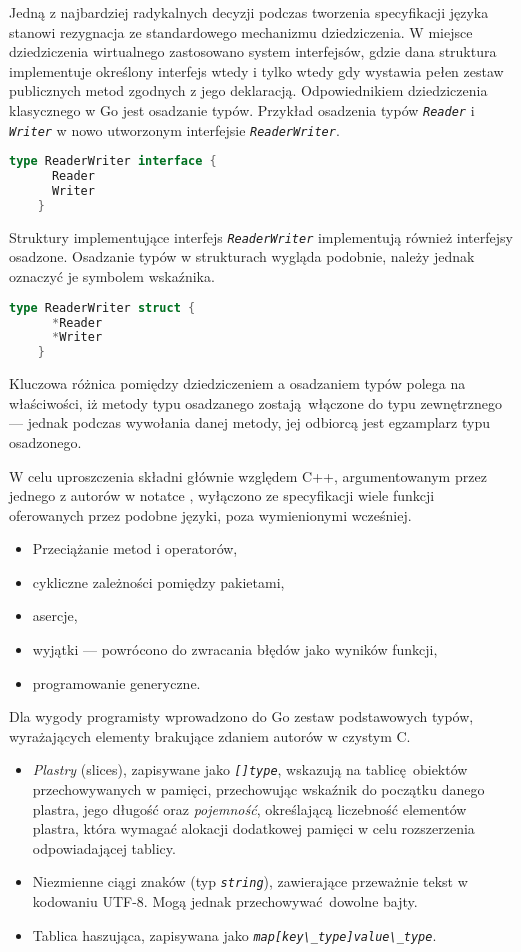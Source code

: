   \par{
  Jedną z najbardziej radykalnych decyzji podczas tworzenia specyfikacji języka stanowi rezygnacja ze standardowego mechanizmu dziedziczenia. W miejsce dziedziczenia wirtualnego zastosowano system interfejsów, gdzie dana struktura implementuje określony interfejs wtedy i tylko wtedy gdy wystawia pełen zestaw publicznych metod zgodnych z jego deklaracją. Odpowiednikiem dziedziczenia klasycznego w Go jest osadzanie typów.
  Przykład osadzenia typów \textit{\lstinline{Reader}} i \textit{\lstinline{Writer}} w nowo utworzonym interfejsie \textit{\lstinline{ReaderWriter}}.
  \begin{lstlisting}[language=go]
    type ReaderWriter interface {
      Reader
      Writer
    }
  \end{lstlisting}
  Struktury implementujące interfejs \textit{\lstinline{ReaderWriter}} implementują również interfejsy osadzone.
  Osadzanie typów w strukturach wygląda podobnie, należy jednak oznaczyć je symbolem wskaźnika.
  \begin{lstlisting}[language=go]
    type ReaderWriter struct {
      *Reader
      *Writer
    }
  \end{lstlisting}
  Kluczowa różnica pomiędzy dziedziczeniem a osadzaniem typów polega na właściwości, iż metody typu osadzanego zostają włączone do typu zewnętrznego --- jednak podczas wywołania danej metody, jej odbiorcą jest egzamplarz typu osadzonego. \cite{godoc:embedding}
}
\par {
W celu uproszczenia składni głównie względem C++, argumentowanym przez jednego z autorów w notatce \cite{Pike:LessIsMore}, wyłączono ze specyfikacji wiele funkcji oferowanych przez podobne języki, poza wymienionymi wcześniej.
  \begin{itemize}
    \item Przeciążanie metod i operatorów,
    \item cykliczne zależności pomiędzy pakietami,
    \item asercje,
    \item wyjątki --- powrócono do zwracania błędów jako wyników funkcji,
    \item programowanie generyczne.
  \end{itemize}
}
\par{
  Dla wygody programisty wprowadzono do Go zestaw podstawowych typów, wyrażających elementy brakujące zdaniem autorów w czystym C.
  \begin{itemize}
    \item \emph{Plastry} (slices), zapisywane jako \textit{\lstinline{[]type}}, wskazują na tablicę obiektów przechowywanych w pamięci, przechowując wskaźnik do początku danego plastra, jego długość oraz \emph{pojemność}, określającą liczebność elementów plastra, która wymagać alokacji dodatkowej pamięci w celu rozszerzenia odpowiadającej tablicy.
    \item Niezmienne ciągi znaków (typ \textit{\lstinline{string}}), zawierające przeważnie tekst w kodowaniu UTF-8. Mogą jednak przechowywać dowolne bajty.
    \item Tablica haszująca, zapisywana jako \textit{\lstinline{map[key\_type]value\_type}}.
  \end{itemize}
}

